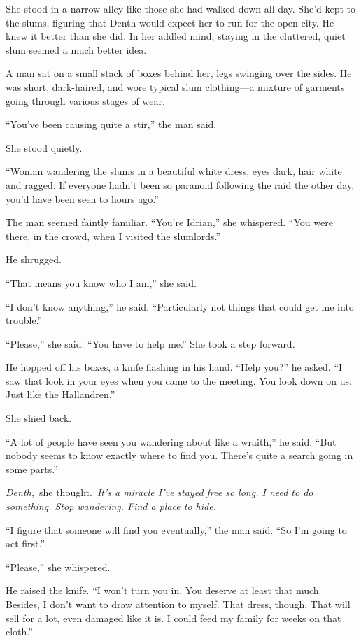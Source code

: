 She stood in a narrow alley like those she had walked down all day. She’d kept to the slums, figuring that Denth would expect her to run for the open city. He knew it better than she did. In her addled mind, staying in the cluttered, quiet slum seemed a much better idea.

A man sat on a small stack of boxes behind her, legs swinging over the sides. He was short, dark-haired, and wore typical slum clothing—a mixture of garments going through various stages of wear.

“You’ve been causing quite a stir,” the man said.

She stood quietly.

“Woman wandering the slums in a beautiful white dress, eyes dark, hair white and ragged. If everyone hadn’t been so paranoid following the raid the other day, you’d have been seen to hours ago.”

The man seemed faintly familiar. “You’re Idrian,” she whispered. “You were there, in the crowd, when I visited the slumlords.”

He shrugged.

“That means you know who I am,” she said.

“I don’t know anything,” he said. “Particularly not things that could get me into trouble.”

“Please,” she said. “You have to help me.” She took a step forward.

He hopped off his boxes, a knife flashing in his hand. “Help you?” he asked. “I saw that look in your eyes when you came to the meeting. You look down on us. Just like the Hallandren.”

She shied back.

“A lot of people have seen you wandering about like a wraith,” he said. “But nobody seems to know exactly where to find you. There’s quite a search going in some parts.”

\textit{Denth,}~she thought.~\textit{It’s a miracle I’ve stayed free so long. I need to do something. Stop wandering. Find a place to hide.}

“I figure that someone will find you eventually,” the man said. “So I’m going to act first.”

“Please,” she whispered.

He raised the knife. “I won’t turn you in. You deserve at least that much. Besides, I don’t want to draw attention to myself. That dress, though. That will sell for a lot, even damaged like it is. I could feed my family for weeks on that cloth.”


